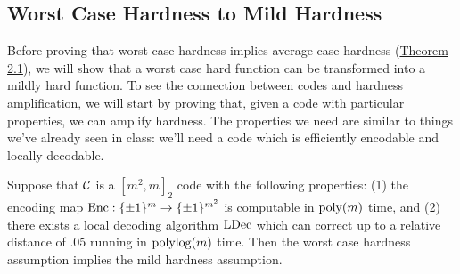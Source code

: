 \documentclass[11pt]{article}
\begin{document}
\subsection{Worst Case Hardness to Mild Hardness}

Before proving that worst case hardness implies average case hardness (\hyperref[t-2-1]{Theorem 2.1}), we will show that a worst case hard function can be transformed into a mildly hard function. To see the connection between codes and hardness amplification, we will start by proving that, given a code with particular properties, we can amplify hardness. The properties we need are similar to things we've already seen in class: we'll need a code which is efficiently encodable and locally decodable. 

\begin{theorem}{2.6}\label{t-2-6}
    Suppose that $\mathcal{C}$ is a $[m^2, m]_2$ code with the following properties: (1) the encoding map $\mathrm{Enc} : \{\pm 1\}^m \rightarrow \{\pm 1\}^{m^2}$ is computable in $\mathrm{poly}(m)$ time, and (2) there exists a local decoding algorithm ${\textup{LDec}}$ which can correct up to a relative distance of $.05$ running in $\mathrm{polylog}(m)$ time. Then the worst case hardness assumption implies the mild hardness assumption.
\end{theorem}
\end{document}
